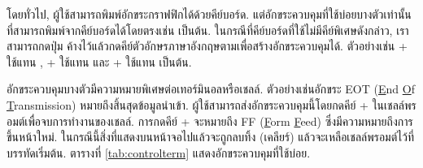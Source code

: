\begin{thwbr}





โดยทั่วไป, ผู้ใช้สามารถพิมพ์อักขระกราฟฟิกได้ด้วยคีย์บอร์ด. แต่อักขระควบคุมที่ใช้บ่อยบางตัวเท่านั้นที่สามารถพิมพ์จากคีย์บอร์ดได้โดยตรงเช่น    เป็นต้น. ในกรณีที่คีย์บอร์ดที่ใช้ไม่มีคีย์พิเศษดังกล่าว, เราสามารถกดปุ่ม  ค้างไว้แล้วกดคีย์ตัวอักษรภาษาอังกฤษตามเพื่อสร้างอักขระควบคุมได้. ตัวอย่างเช่น + ใช้แทน , + ใช้แทน  และ + ใช้แทน  เป็นต้น.


อักขระควบคุมบางตัวมีความหมายพิเศษต่อเทอร์มินอลหรือเชลล์. ตัวอย่างเช่นอักขระ EOT (\underline{E}nd \underline{O}f \underline{T}ransmission) %
%
หมายถึงสิ้นสุดข้อมูลนำเข้า. ผู้ใช้สามารถส่งอักขระควบคุมนี้โดยกดคีย์ + ในเชลล์พรอมต์เพื่อจบการทำงานของเชลล์. การกดคีย์ + จะหมายถึง FF (\underline{F}orm \underline{F}eed) ซึ่งมีความหมายถึงการขึ้นหน้าใหม่. ในกรณีนี้สิ่งที่แสดงบนหน้าจอไปแล้วจะถูกลบทิ้ง (เคลียร์) แล้วจะเหลือเชลล์พรอมต์ไว้ที่บรรทัดเริ่มต้น. ตารางที่ \ref{tab:controlterm} แสดงอักขระควบคุมที่ใช้บ่อย. 


\end{thwbr}
